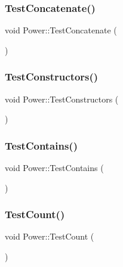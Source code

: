 \mbox{\label{namespace_power_a97269203badd9375fab60db5f5b11dc5}} 
\subsubsection{\texorpdfstring{Test\+Concatenate()}{TestConcatenate()}}
{\footnotesize\ttfamily void Power\+::\+Test\+Concatenate (\begin{DoxyParamCaption}{ }\end{DoxyParamCaption})}

\mbox{\label{namespace_power_ac74fec7f3704b9c554276fa307de5bc5}} 
\subsubsection{\texorpdfstring{Test\+Constructors()}{TestConstructors()}}
{\footnotesize\ttfamily void Power\+::\+Test\+Constructors (\begin{DoxyParamCaption}{ }\end{DoxyParamCaption})}

\mbox{\label{namespace_power_a0746abde7fa9ae05b141ec163fb7f9fc}} 
\subsubsection{\texorpdfstring{Test\+Contains()}{TestContains()}}
{\footnotesize\ttfamily void Power\+::\+Test\+Contains (\begin{DoxyParamCaption}{ }\end{DoxyParamCaption})}

\mbox{\label{namespace_power_ae4542ac2c3572f11b82b87325716284c}} 
\subsubsection{\texorpdfstring{Test\+Count()}{TestCount()}}
{\footnotesize\ttfamily void Power\+::\+Test\+Count (\begin{DoxyParamCaption}{ }\end{DoxyParamCaption})}

